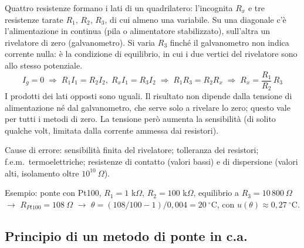 \documentclass[11pt,a4paper]{article}
\begin{document}
Quattro resistenze formano i lati di un quadrilatero: l'incognita $R_x$ e tre resistenze tarate $R_1$, $R_2$, $R_3$, di cui almeno una variabile. Su una diagonale c'è l'alimentazione in continua (pila o alimentatore stabilizzato), sull'altra un rivelatore di zero (galvanometro). Si varia $R_3$ finché il galvanometro non indica corrente nulla: è la condizione di equilibrio, in cui i due vertici del rivelatore sono allo stesso potenziale.
\[
I_g = 0 \;\Rightarrow\; R_1 I_1 = R_2 I_2,\; R_x I_1 = R_3 I_2 \;\Rightarrow\; R_1 R_3 = R_2 R_x \;\Rightarrow\; R_x = \frac{R_1}{R_2}\,R_3
\]
I prodotti dei lati opposti sono uguali. Il risultato non dipende dalla tensione di alimentazione né dal galvanometro, che serve solo a rivelare lo zero; questo vale per tutti i metodi di zero. La tensione però aumenta la sensibilità (di solito qualche volt, limitata dalla corrente ammessa dai resistori).

Cause di errore: sensibilità finita del rivelatore; tolleranza dei resistori; f.e.m.\ termoelettriche; resistenze di contatto (valori bassi) e di dispersione (valori alti, isolamento oltre $10^{10}\ \Omega$).

Esempio: ponte con Pt100, $R_1 = 1$ k$\Omega$, $R_2 = 100$ k$\Omega$, equilibrio a $R_3 = 10\,800\ \Omega$ $\rightarrow$ $R_{Pt100} = 108\ \Omega$ $\rightarrow$ $\theta = (108/100 - 1)/0{,}004 = 20\ ^\circ$C, con $u(\theta) \approx 0{,}27\ ^\circ$C.

\subsection*{Principio di un metodo di ponte in c.a.}
\end{document}
